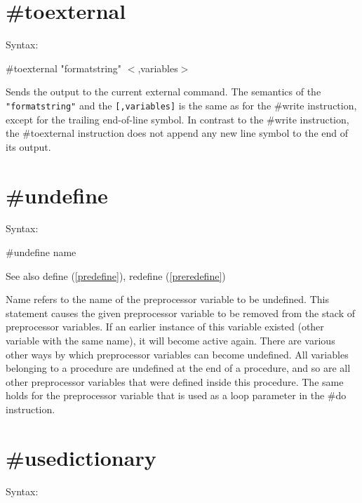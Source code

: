 
\section{\#toexternal}
\label{pretoexternal}

\noindent Syntax:

\#toexternal "formatstring" $<$,variables$>$

\noindent Sends the output to the current external 
command. The semantics of the \verb|"formatstring"| and the
\verb|[,variables]| is the same as for the \#write 
instruction, except for the trailing end-of-line symbol. In contrast to the 
\#write instruction, the \#toexternal instruction does not append any new 
line symbol to the end of its output.


\section{\#undefine}
\label{preundefine}

\noindent Syntax:

\#undefine name
 
\noindent See also define (\ref{predefine}), redefine 
(\ref{preredefine})

\noindent {} Name refers to the name of the 
preprocessor variable to be undefined. This 
statement causes the given preprocessor variable to be removed from the 
stack of preprocessor variables. If an earlier instance of this variable 
existed (other variable with the same name), it will become active again. 
There are various other ways by which preprocessor variables can become 
undefined. All variables belonging to a procedure are undefined at the end 
of a procedure, and so are all other preprocessor variables that were 
defined inside this procedure. The same holds for the preprocessor variable 
that is used as a loop parameter in the \#do instruction.

 
\section{\#usedictionary}
\label{preusedictionary}

\noindent Syntax:

